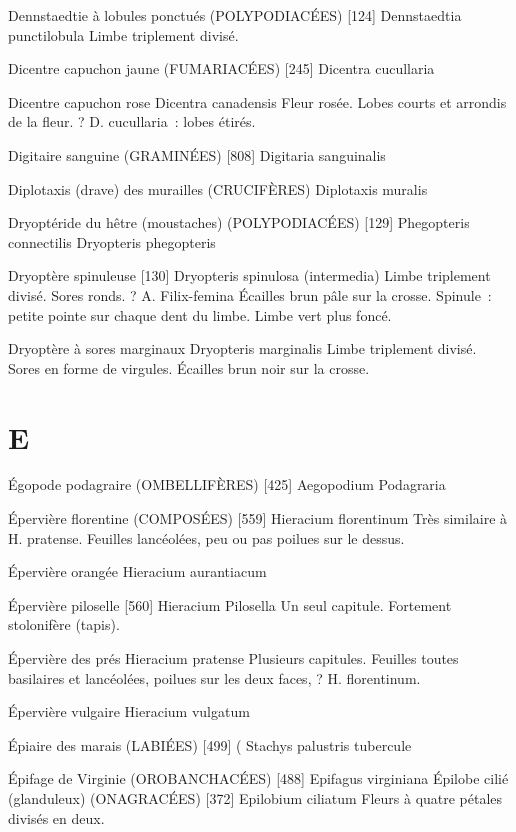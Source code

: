 Dennstaedtie à lobules ponctués (POLYPODIACÉES) [124]
				Dennstaedtia punctilobula
Limbe triplement divisé.

Dicentre capuchon jaune (FUMARIACÉES)  [245]
				Dicentra cucullaria

Dicentre capuchon rose
				Dicentra canadensis
Fleur rosée. Lobes courts et arrondis de la fleur. ? D. cucullaria : lobes étirés.

Digitaire sanguine (GRAMINÉES)  [808]
				Digitaria sanguinalis

Diplotaxis (drave) des murailles  (CRUCIFÈRES)
				Diplotaxis muralis



Dryoptéride du hêtre (moustaches) (POLYPODIACÉES)  [129]
				Phegopteris connectilis
				Dryopteris phegopteris

Dryoptère spinuleuse  [130]
				Dryopteris spinulosa (intermedia)
Limbe triplement divisé. Sores ronds.
? A. Filix-femina
Écailles brun pâle sur la crosse.
Spinule : petite pointe sur chaque dent du limbe.
Limbe vert plus foncé.

Dryoptère à sores marginaux
				Dryopteris marginalis
Limbe triplement divisé. Sores en forme de virgules.
Écailles brun noir sur la crosse.

\chapter*{E}

Égopode podagraire (OMBELLIFÈRES)  [425]
				Aegopodium Podagraria



Épervière florentine (COMPOSÉES)  [559]
				Hieracium florentinum
Très similaire à H. pratense. Feuilles lancéolées, peu ou pas poilues sur le dessus.

Épervière orangée
				Hieracium aurantiacum

Épervière piloselle  [560]
				Hieracium Pilosella
Un seul capitule. Fortement stolonifère (tapis).

Épervière des prés
				Hieracium pratense
Plusieurs capitules. Feuilles toutes basilaires et lancéolées, poilues sur les deux faces, ? H. florentinum.

Épervière vulgaire
				Hieracium vulgatum

Épiaire des marais (LABIÉES)  [499]				(
				Stachys palustris			tubercule

Épifage de Virginie (OROBANCHACÉES)  [488]
				Epifagus virginiana
Épilobe cilié (glanduleux) (ONAGRACÉES)  [372]
				Epilobium ciliatum
Fleurs à quatre pétales divisés en deux.

